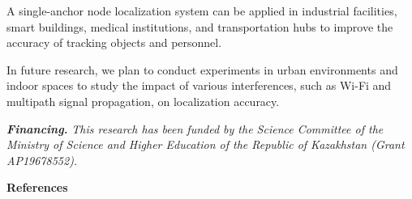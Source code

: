 \begin{multicols}{2}
A single-anchor node localization system can be applied in industrial
facilities, smart buildings, medical institutions, and transportation
hubs to improve the accuracy of tracking objects and personnel.

In future research, we plan to conduct experiments in urban environments
and indoor spaces to study the impact of various interferences, such as
Wi-Fi and multipath signal propagation, on localization accuracy.

\emph{{\bfseries Financing.}} \emph{This research has been funded by the
Science Committee of the Ministry of Science and Higher Education of the
Republic of Kazakhstan (Grant AP19678552).}
\end{multicols}

\begin{center}
{\bfseries References}
\end{center}

